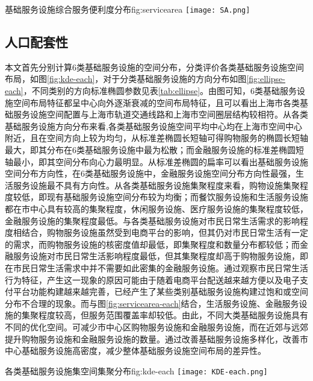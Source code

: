 \documentclass{shnuthesis}
\begin{document}
\begin{generalfig}[H]{基础服务设施综合服务便利度分布}{fig:servicearea}
	\texttt{[image: SA.png]}
\end{generalfig}

\subsection{人口配套性}


本文首先分别计算6类基础服务设施的空间分布，分类评价各类基础服务设施空间布局，如图\ref{fig:kde-each}，对于分类基础服务设施的方向分布如图\ref{fig:ellipse-each}，不同类别的方向标准椭圆参数见表\ref{tab:ellipse}。由图可知，6类基础服务设施空间布局特征都呈中心向外逐渐衰减的空间布局特征，且可以看出上海市各类基础服务设施空间配置与上海市轨道交通线路和上海市空间圈层结构较相符。从各类基础服务设施方向分布来看,各类基础服务设施空间平均中心均在上海市空间中心附近，且在空间方向上较为均匀，从标准差椭圆长短轴可得购物服务的椭圆长短轴最大，即其分布在6类基础服务设施中最为松散；而金融服务设施的标准差椭圆短轴最小，即其空间分布向心力最明显。从标准差椭圆的扁率可以看出基础服务设施空间分布方向性，在6类基础服务设施中，金融服务设施空间分布方向性最强，生活服务设施最不具有方向性。从各类基础服务设施集聚程度来看，购物设施集聚程度较低，即现有基础服务设施空间分布较为均衡；而餐饮服务设施和生活服务设施都在市中心具有较高的集聚程度，休闲服务设施、医疗服务设施的集聚程度较低，金融服务设施的集聚程度最低。与各类基础服务设施对市民日常生活需求的影响程度相结合，购物服务设施虽然受到电商平台的影响，但其仍对市民日常生活有一定的需求，而购物服务设施的核密度值却最低，即集聚程度和数量分布都较低；而金融服务设施对市民日常生活影响程度最低，但其集聚程度却高于购物服务设施，即在市民日常生活需求中并不需要如此密集的金融服务设施。通过观察市民日常生活行为特征，产生这一现象的原因可能由于随着电商平台配送越来越方便以及电子支付平台功能构建越来越完善，已经产生了某些类别基础服务设施构建过饱和或空间分布不合理的现象。而与图\ref{fig:servicearea-each}结合，生活服务设施、金融服务设施的集聚程度较高，但服务范围覆盖率却较低。由此，不同大类基础服务设施具有不同的优化空间。可减少市中心区购物服务设施和金融服务设施，而在近郊与远郊提升购物服务设施和金融服务设施的数量。通过改善基础服务设施多样化，改善市中心基础服务设施高密度，减少整体基础服务设施空间布局的差异性。

\begin{generalfig}[htb]{各类基础服务设施集空间集聚分布}{fig:kde-each}
	\texttt{[image: KDE-each.png]}
\end{generalfig}
\end{document}

